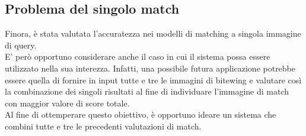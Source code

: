 \documentclass[12pt,a4paper,openright,twoside]{book}
\begin{document}
\subsection{Problema del singolo match}
Finora, è stata valutata l'accuratezza nei modelli di matching a singola immagine di query. \\
E' però opportuno considerare anche il caso in cui il sistema possa essere utilizzato nella sua interezza. Infatti, una possibile futura applicazione potrebbe essere quella di fornire in input tutte e tre le immagini di bitewing e valutare così la combinazione dei singoli risultati al fine di individuare l'immagine di match con maggior valore di score totale.\\
Al fine di ottemperare questo obiettivo, è opportuno ideare un sistema che combini tutte e tre le precedenti valutazioni di match.

\end{document}
